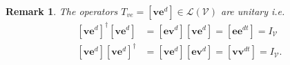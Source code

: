 \documentclass[aps,preprint]{revtex4}%
\newtheorem{remark}[theorem]{Remark}
\begin{document}
\begin{remark}
The operators $T_{ve}=\left[  \boldsymbol{v}\mathbf{e}^{d}\right]
\in\mathcal{L}\left(  \mathcal{V}\right)  $ are unitary i.e.
\begin{align}
\left[  \boldsymbol{v}\mathbf{e}^{d}\right]  ^{\dagger}\left[  \boldsymbol{v}%
\mathbf{e}^{d}\right]   &  =\left[  \mathbf{e}\boldsymbol{v}^{d}\right]
\left[  \boldsymbol{v}\mathbf{e}^{d}\right]  =\left[  \mathbf{ee}^{dt}\right]
=I_{\mathcal{V}}\\
\left[  \boldsymbol{v}\mathbf{e}^{d}\right]  \left[  \boldsymbol{v}%
\mathbf{e}^{d}\right]  ^{\dagger}  &  =\left[  \boldsymbol{v}\mathbf{e}%
^{d}\right]  \left[  \mathbf{e}\boldsymbol{v}^{d}\right]  =\left[
\boldsymbol{vv}^{dt}\right]  =I_{\mathcal{V}}.
\end{align}

\end{remark}
\end{document}
